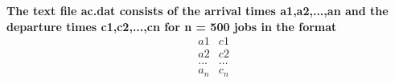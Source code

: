 \textbf{The text file ac.dat consists of the arrival times a1,a2,...,an and the departure
times c1,c2,...,cn for n = 500 jobs in the format}
\begin{align*}
&a1 &c1\\
&a2 &c2\\
&... &...\\
&a_n &c_n\\
\end{align*}\\ 